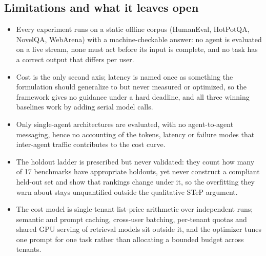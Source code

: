 \subsection{Limitations and what it leaves open}
\begin{itemize}[leftmargin=*,itemsep=1pt,topsep=2pt]
\item Every experiment runs on a static offline corpus (HumanEval, HotPotQA, NovelQA, WebArena) with a machine-checkable answer: no agent is evaluated on a live stream, none must act before its input is complete, and no task has a correct output that differs per user.
\item Cost is the only second axis; latency is named once as something the formulation should generalize to but never measured or optimized, so the framework gives no guidance under a hard deadline, and all three winning baselines work by adding serial model calls.
\item Only single-agent architectures are evaluated, with no agent-to-agent messaging, hence no accounting of the tokens, latency or failure modes that inter-agent traffic contributes to the cost curve.
\item The holdout ladder is prescribed but never validated: they count how many of 17 benchmarks have appropriate holdouts, yet never construct a compliant held-out set and show that rankings change under it, so the overfitting they warn about stays unquantified outside the qualitative STeP argument.
\item The cost model is single-tenant list-price arithmetic over independent runs; semantic and prompt caching, cross-user batching, per-tenant quotas and shared GPU serving of retrieval models sit outside it, and the optimizer tunes one prompt for one task rather than allocating a bounded budget across tenants.
\end{itemize}
